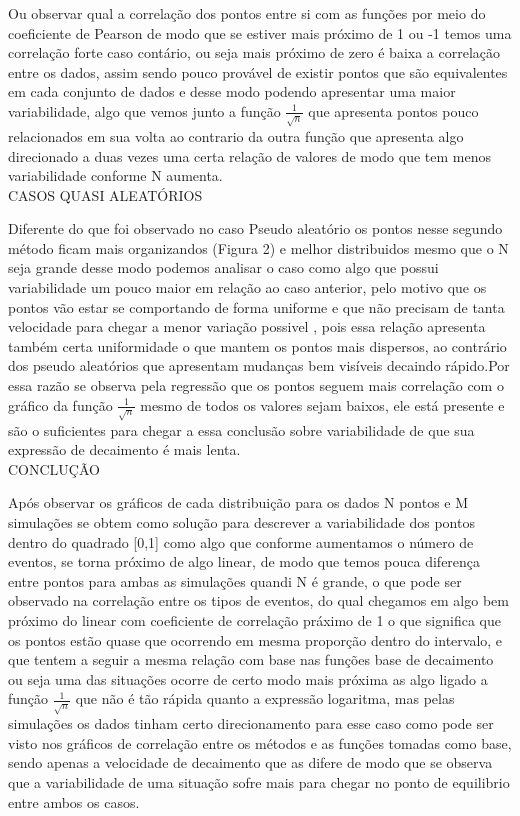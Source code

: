 \documentclass[a4paper, 12pt]{article}
\begin{document}
  Ou observar qual a correlação dos pontos entre si com as funções por meio do coeficiente de Pearson de modo que se estiver mais próximo de 1 ou -1 temos uma correlação forte caso contário, ou seja mais próximo de zero é baixa a correlação entre os dados, assim sendo  pouco provável de existir pontos que são equivalentes em cada conjunto de dados e desse modo podendo apresentar uma maior variabilidade, algo que vemos junto a função $\frac{1}{\sqrt{n}}$ que apresenta pontos pouco relacionados em sua volta ao contrario da outra função que apresenta algo direcionado a  duas vezes  uma certa relação de valores de modo que tem menos variabilidade conforme N aumenta.\\
  
\textsc{CASOS QUASI ALEATÓRIOS}
\newline

Diferente do que foi observado no caso Pseudo aleatório os pontos nesse segundo método ficam mais organizandos (Figura 2)  e melhor distribuidos mesmo que o N seja grande desse modo podemos analisar o caso como algo que possui variabilidade um pouco maior em relação ao caso anterior,  pelo motivo que os pontos vão estar se comportando de forma uniforme e que não precisam de tanta velocidade para chegar a menor variação possivel , pois essa relação apresenta também certa uniformidade o que mantem os pontos mais dispersos, ao contrário dos pseudo aleatórios que apresentam mudanças bem visíveis decaindo rápido.Por essa razão se observa pela regressão que os pontos seguem mais correlação com o gráfico da função $\frac{1}{\sqrt{n}}$ mesmo de todos os valores sejam baixos, ele está presente e são o suficientes para chegar a essa conclusão sobre variabilidade de que sua expressão de decaimento é mais lenta.\\
  
\textsc{CONCLUÇÃO}
\newline

   Após observar os gráficos de cada distribuição para os dados N pontos e M simulações se obtem como solução para descrever a variabilidade dos pontos dentro do quadrado [0,1] como algo que conforme aumentamos o número de eventos, se torna próximo de algo linear, de modo que temos pouca diferença entre pontos para ambas as simulações quandi N é grande, o que pode ser observado na correlação entre os tipos de eventos, do qual  chegamos em algo bem próximo do linear com coeficiente de correlação práximo de 1 o que significa que os pontos estão quase que ocorrendo em mesma proporção dentro do intervalo, e que tentem a seguir  a mesma relação com base nas funções base de decaimento ou seja uma das situações ocorre de certo modo mais próxima as algo ligado a função  $\frac{1}{\sqrt{n}}$ que não é tão rápida quanto a expressão logaritma, mas pelas simulações os dados tinham certo direcionamento para esse caso como pode ser visto nos gráficos de correlação entre os métodos e as funções tomadas como base, sendo apenas  a velocidade de  decaimento que as difere de modo que se observa que a variabilidade de uma situação sofre mais para chegar no ponto de equilibrio entre ambos os casos.\\
  
\end{document}
